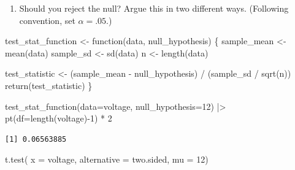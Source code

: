 \documentclass[
  letterpaper,
  DIV=11,
  numbers=noendperiod]{scrreprt}
\newenvironment{Shaded}{\begin{snugshade}}{\end{snugshade}}
\newcommand{\AttributeTok}[1]{\textcolor[rgb]{0.40,0.45,0.13}{#1}}
\newcommand{\ControlFlowTok}[1]{\textcolor[rgb]{0.00,0.23,0.31}{#1}}
\newcommand{\DecValTok}[1]{\textcolor[rgb]{0.68,0.00,0.00}{#1}}
\newcommand{\FunctionTok}[1]{\textcolor[rgb]{0.28,0.35,0.67}{#1}}
\newcommand{\NormalTok}[1]{\textcolor[rgb]{0.00,0.23,0.31}{#1}}
\newcommand{\OtherTok}[1]{\textcolor[rgb]{0.00,0.23,0.31}{#1}}
\newcommand{\SpecialCharTok}[1]{\textcolor[rgb]{0.37,0.37,0.37}{#1}}
\newcommand{\StringTok}[1]{\textcolor[rgb]{0.13,0.47,0.30}{#1}}
\providecommand{\tightlist}{%
  \setlength{\itemsep}{0pt}\setlength{\parskip}{0pt}}\usepackage{longtable,booktabs,array}
\begin{document}
\begin{enumerate}
\def\labelenumi{\arabic{enumi}.}
\setcounter{enumi}{4}
\tightlist
\item
  Should you reject the null? Argue this in two different ways.
  (Following convention, set \(\alpha = .05\).)
\end{enumerate}

\begin{Shaded}
\begin{Highlighting}[]
\NormalTok{test\_stat\_function }\OtherTok{\textless{}{-}} \ControlFlowTok{function}\NormalTok{(data, null\_hypothesis) \{ }
\NormalTok{  sample\_mean }\OtherTok{\textless{}{-}} \FunctionTok{mean}\NormalTok{(data)}
\NormalTok{  sample\_sd   }\OtherTok{\textless{}{-}} \FunctionTok{sd}\NormalTok{(data)}
\NormalTok{  n           }\OtherTok{\textless{}{-}} \FunctionTok{length}\NormalTok{(data)}
  
\NormalTok{  test\_statistic }\OtherTok{\textless{}{-}}\NormalTok{ (sample\_mean }\SpecialCharTok{{-}}\NormalTok{ null\_hypothesis) }\SpecialCharTok{/}\NormalTok{ (sample\_sd }\SpecialCharTok{/} \FunctionTok{sqrt}\NormalTok{(n))}
  \FunctionTok{return}\NormalTok{(test\_statistic)}
\NormalTok{\}}
\end{Highlighting}
\end{Shaded}

\begin{Shaded}
\begin{Highlighting}[]
\FunctionTok{test\_stat\_function}\NormalTok{(}\AttributeTok{data=}\NormalTok{voltage, }\AttributeTok{null\_hypothesis=}\DecValTok{12}\NormalTok{) }\SpecialCharTok{|\textgreater{}} 
  \FunctionTok{pt}\NormalTok{(}\AttributeTok{df=}\FunctionTok{length}\NormalTok{(voltage)}\SpecialCharTok{{-}}\DecValTok{1}\NormalTok{) }\SpecialCharTok{*} \DecValTok{2}
\end{Highlighting}
\end{Shaded}

\begin{verbatim}
[1] 0.06563885
\end{verbatim}

\begin{Shaded}
\begin{Highlighting}[]
\FunctionTok{t.test}\NormalTok{(}
  \AttributeTok{x           =}\NormalTok{ voltage, }
  \AttributeTok{alternative =} \StringTok{\textquotesingle{}two.sided\textquotesingle{}}\NormalTok{, }
  \AttributeTok{mu          =} \DecValTok{12}\NormalTok{)}
\end{Highlighting}
\end{Shaded}
\end{document}
